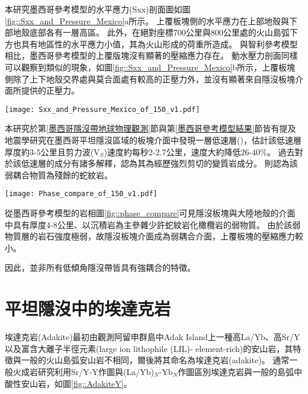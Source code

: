 本研究墨西哥參考模型的水平應力(Sxx)剖面圖如圖\ref{fig::Sxx_and_Pressure_Mexico}a所示。
上覆板塊側的水平應力在上部地殼與下部地殼底部各有一層高區。
此外，在絕對座標700公里與800公里處的火山島弧下方也具有地區性的水平應力小值，其為火山形成的荷重所造成。
與智利參考模型相比，墨西哥參考模型的上覆版塊沒有顯著的壓縮應力存在。
動水壓力剖面同樣可以觀察到類似的現象，如圖\ref{fig::Sxx_and_Pressure_Mexico}b所示，上覆板塊側除了上下地殼交界處與莫合面處有較高的正壓力外，並沒有顯著來自隱沒板塊介面所提供的正壓力。
\begin{figure*}[h]
    \centering
    \texttt{[image: Sxx\_and\_Pressure\_Mexico\_of\_150\_v1.pdf]}
    \caption[參考模型中於30 Myr的水平應力剖面]{參考模型中於30 Myr的水平應力剖面。}
    \label{fig::Sxx_and_Pressure_Mexico}
\end{figure*}

本研究於第\ref{墨西哥隱沒帶地球物理觀測}節與第\ref{墨西哥參考模型結果}節皆有提及地震學研究在墨西哥平坦隱沒區域的板塊介面中發現一層低速層(\citealp{PerezCampos2008})，\citealp{Song2009}估計該低速層厚度約3-5公里且剪力波(V$_S$)速度約每秒2-2.7公里，速度大約降低26-40$\%$。
過去對於該低速層的成分有諸多解釋，\citealp{Song2012SC}認為其為經歷強烈剪切的變質岩成分。
\citealp{Manea2017}則認為該弱耦合物質為殘餘的蛇紋岩。

\begin{figure*}[h]
    \centering
    \texttt{[image: Phase\_compare\_of\_150\_v1.pdf]}
    \caption[參考模型中於30 Myr的岩相剖面]{參考模型中於30 Myr的岩相剖面。}
    \label{fig::phase_compare}
\end{figure*}

從墨西哥參考模型的岩相圖\ref{fig::phase_compare}可見隱沒板塊與大陸地殼的介面中具有厚度4-8公里、以沉積岩為主參雜少許蛇紋岩化橄欖岩的弱物質。
由於該弱物質層的岩石強度極弱，故隱沒板塊介面成為弱耦合介面，上覆板塊的壓縮應力較小。

因此，並非所有低傾角隱沒帶皆具有強耦合的特徵。

\section{平坦隱沒中的埃達克岩}\label{平坦隱沒中的埃達克岩}
埃達克岩(Adakite)最初由\citealp{kay1978aleutian}觀測阿留申群島中Adak Island上一種高La/Yb、高Sr/Y以及富含大離子半徑元素(large ion lithophile (LIL)- element-rich)的安山岩，其特徵與一般的火山島弧安山岩不相同，爾後\citealp{defant1990derivation}將其命名為埃達克岩(adakite)。
通常一般火成岩研究利用Sr/Y-Y作圖與(La/Yb)$_N$-Yb$_N$作圖區別埃達克岩與一般的島弧中酸性安山岩，如圖\ref{fig::AdakiteY}。


